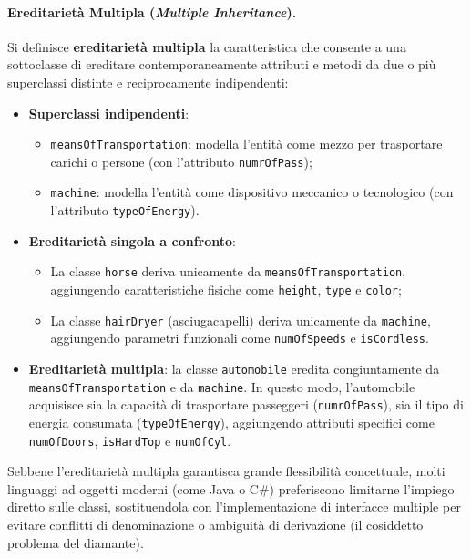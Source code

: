 \documentclass[12pt]{extarticle}
\begin{document}
\paragraph{Ereditarietà Multipla (\textit{Multiple Inheritance}).}
Si definisce \textbf{ereditarietà multipla} la caratteristica che consente a una sottoclasse di ereditare contemporaneamente attributi e metodi da due o più superclassi distinte e reciprocamente indipendenti:
\begin{itemize}
    \item \textbf{Superclassi indipendenti}:
    \begin{itemize}
        \item \texttt{meansOfTransportation}: modella l'entità come mezzo per trasportare carichi o persone (con l'attributo \texttt{numrOfPass});
        \item \texttt{machine}: modella l'entità come dispositivo meccanico o tecnologico (con l'attributo \texttt{typeOfEnergy}).
    \end{itemize}
    \item \textbf{Ereditarietà singola a confronto}:
    \begin{itemize}
        \item La classe \texttt{horse} deriva unicamente da \texttt{meansOfTransportation}, aggiungendo caratteristiche fisiche come \texttt{height}, \texttt{type} e \texttt{color};
        \item La classe \texttt{hairDryer} (asciugacapelli) deriva unicamente da \texttt{machine}, aggiungendo parametri funzionali come \texttt{numOfSpeeds} e \texttt{isCordless}.
    \end{itemize}
    \item \textbf{Ereditarietà multipla}: la classe \texttt{automobile} eredita congiuntamente da \texttt{meansOfTransportation} e da \texttt{machine}. In questo modo, l'automobile acquisisce sia la capacità di trasportare passeggeri (\texttt{numrOfPass}), sia il tipo di energia consumata (\texttt{typeOfEnergy}), aggiungendo attributi specifici come \texttt{numOfDoors}, \texttt{isHardTop} e \texttt{numOfCyl}.
\end{itemize}
\noindent Sebbene l'ereditarietà multipla garantisca grande flessibilità concettuale, molti linguaggi ad oggetti moderni (come Java o C\#) preferiscono limitarne l'impiego diretto sulle classi, sostituendola con l'implementazione di interfacce multiple per evitare conflitti di denominazione o ambiguità di derivazione (il cosiddetto problema del diamante).
\end{document}
